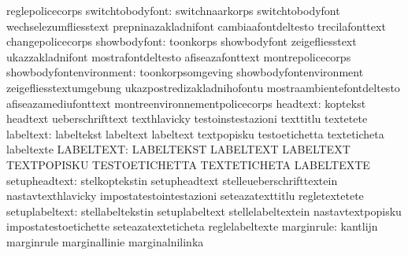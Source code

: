                                   reglepolicecorps
                switchtobodyfont: switchnaarkorps                  switchtobodyfont
                                  wechselezumfliesstext            prepninazakladnifont
                                  cambiaafontdeltesto              trecilafonttext
                                  changepolicecorps
                    showbodyfont: toonkorps                        showbodyfont
                                  zeigefliesstext                  ukazzakladnifont
                                  mostrafontdeltesto               afiseazafonttext
                                  montrepolicecorps
         showbodyfontenvironment: toonkorpsomgeving                showbodyfontenvironment
                                  zeigefliesstextumgebung          ukazpostredizakladnihofontu
                                  mostraambientefontdeltesto       afiseazamediufonttext
                                  montreenvironnementpolicecorps
                        headtext: koptekst                         headtext
                                  ueberschrifttext                 texthlavicky
                                  testoinstestazioni               texttitlu
                                  textetete
                       labeltext: labeltekst                       labeltext
                                  labeltext                        textpopisku
                                  testoetichetta                   texteticheta
                                  labeltexte
                       LABELTEXT: LABELTEKST                       LABELTEXT
                                  LABELTEXT                        TEXTPOPISKU
                                  TESTOETICHETTA                   TEXTETICHETA
                                  LABELTEXTE
                   setupheadtext: stelkoptekstin                   setupheadtext
                                  stelleueberschrifttextein        nastavtexthlavicky
                                  impostatestointestazioni         seteazatexttitlu
                                  regletextetete
                  setuplabeltext: stellabeltekstin                 setuplabeltext
                                  stellelabeltextein               nastavtextpopisku
                                  impostatestoetichette            seteazatexteticheta
                                  reglelabeltexte
                      marginrule: kantlijn                         marginrule
                                  marginallinie                    marginalnilinka
